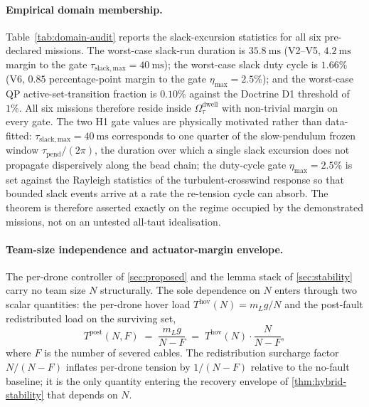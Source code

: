 \paragraph{Empirical domain membership.} Table~\ref{tab:domain-audit} reports the slack-excursion statistics for all six pre-declared missions. The worst-case slack-run duration is $\SI{35.8}{\milli\second}$ (V2--V5, $\SI{4.2}{\milli\second}$ margin to the gate $\tau_{\mathrm{slack,max}} = \SI{40}{\milli\second}$); the worst-case slack duty cycle is $1.66\%$ (V6, $0.85$ percentage-point margin to the gate $\eta_{\max} = 2.5\%$); and the worst-case QP active-set-transition fraction is $0.10\%$ against the Doctrine D1 threshold of $1\%$. All six missions therefore reside inside $\Omega_\tau^{\mathrm{dwell}}$ with non-trivial margin on every gate. The two H1 gate values are physically motivated rather than data-fitted: $\tau_{\mathrm{slack,max}} = \SI{40}{\milli\second}$ corresponds to one quarter of the slow-pendulum frozen window $\tau_{\mathrm{pend}}/(2\pi)$, the duration over which a single slack excursion does not propagate dispersively along the bead chain; the duty-cycle gate $\eta_{\max} = 2.5\%$ is set against the Rayleigh statistics of the turbulent-crosswind response so that bounded slack events arrive at a rate the re-tension cycle can absorb. The theorem is therefore asserted exactly on the regime occupied by the demonstrated missions, not on an untested all-taut idealisation.

\paragraph{Team-size independence and actuator-margin envelope.} The per-drone controller of \cref{sec:proposed} and the lemma stack of \cref{sec:stability} carry no team size $N$ structurally. The sole dependence on $N$ enters through two scalar quantities: the per-drone hover load $T^{\mathrm{hov}}(N) = m_L g / N$ and the post-fault redistributed load on the surviving set,
\begin{equation}
  T^{\mathrm{post}}(N, F) \;=\; \frac{m_L g}{N - F}
   \;=\; T^{\mathrm{hov}}(N) \cdot \frac{N}{N - F},
   \label{eq:tension-postfault-N}
\end{equation}
where $F$ is the number of severed cables. The redistribution surcharge factor $N/(N{-}F)$ inflates per-drone tension by $1/(N{-}F)$ relative to the no-fault baseline; it is the only quantity entering the recovery envelope of \cref{thm:hybrid-stability} that depends on $N$.

